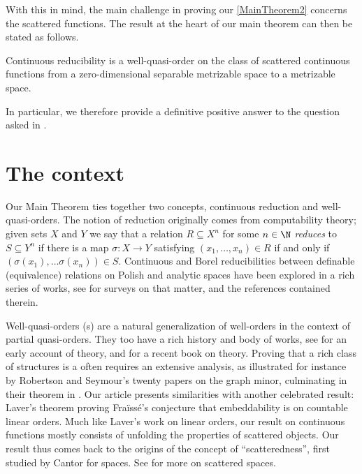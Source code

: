With this in mind, the main challenge in proving our \cref{MainTheorem2} concerns the scattered functions.
The result at the heart of our main theorem can then be stated as follows.


\begin{maintheorem}\label{MainTheorem3}
Continuous reducibility is a well-quasi-order on the class of scattered continuous functions from a zero-dimensional separable metrizable space to a metrizable space.
\end{maintheorem}

In particular, we therefore provide a definitive positive answer to the question asked in \cite[Question 5.5]{carroy2013quasi}.
 

\section{The context}
Our Main Theorem ties together two concepts, continuous reduction and well-quasi-orders.
The notion of reduction originally comes from computability theory; given sets $X$ and $Y$ we say that a relation $R\subseteq X^n$ for some $n\in\N$ \emph{reduces} to
$S\subseteq Y^n$ if there is a map $\sigma:X\to Y$ satisfying $(x_1,\ldots,x_n)\in R$ if and only if $(\sigma(x_1),\ldots\sigma(x_n))\in S$.
Continuous and Borel reducibilities between definable (equivalence) relations on Polish and analytic spaces have been explored in a rich series of works,
see \cite{MR1791302,MottoRosSurvey,MR3837073} for surveys on that matter, and the references contained therein.

Well-quasi-orders (\wqo{}s) are a natural generalization of well-orders in the context of partial quasi-orders. They too have a rich history and body of works,
see \cite{kruskal1972theory} for an early account of \wqo{} theory, and \cite{WQObook} for a recent book on \wqo{} theory.
Proving that a rich class of structures is a \wqo{} often requires an extensive analysis, as illustrated for instance by Robertson and Seymour's twenty papers on
the graph minor, culminating in their \wqo{} theorem in \cite{Robertson2004325}.
Our article presents similarities with another celebrated \wqo{} result: Laver's theorem \cite{laverfraisse} proving Fraïssé's conjecture that embeddability is \wqo{} on countable linear orders.
Much like Laver's work on linear orders, our result on continuous functions mostly consists of unfolding the properties of scattered objects.
Our result thus comes back to the origins of the concept of \enquote{scatteredness}, first studied by Cantor for spaces.
See \cite{MR0107806,MR0107849,MR0334150} for more on scattered spaces.

